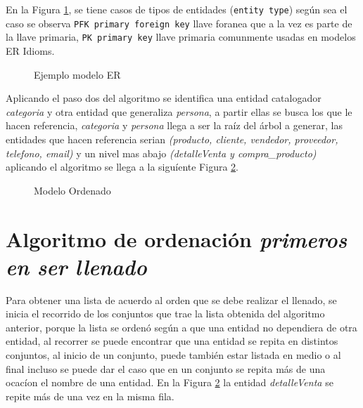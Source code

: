 En la Figura \ref{fig:Modelo ER}, se tiene casos de tipos de entidades (\texttt{entity type}) seg\'un sea el caso se observa \texttt{PFK primary foreign key} llave foranea que a la vez es parte de la llave primaria, \texttt{PK primary key} llave primaria comunmente usadas en modelos ER Idioms.
\begin{figure}[H]
\centering
{}
\caption{Ejemplo modelo ER} 
\label{fig:Modelo ER}
\end{figure}
Aplicando el paso dos del algoritmo se identifica una entidad catalogador \emph{categoria} y otra entidad que generaliza \emph{persona}, a partir ellas se busca los que le hacen referencia, \textit{categoria} y \textit{persona} llega a ser  la ra\'iz del \'arbol a generar, las entidades que hacen referencia serian \textit{(producto, cliente, vendedor, proveedor, telefono, email)} y un nivel mas abajo \textit{(detalleVenta y compra\_producto)}  aplicando el algoritmo se llega a la sigu\'iente Figura \ref{fig:ModeloOrdenado}.
\begin{figure}[H]
\centering
{}
\caption{Modelo Ordenado} \label{fig:ModeloOrdenado}
\end{figure}
\section{Algoritmo de ordenaci\'on \textit{primeros en ser llenado}}
\label{Algoritmo de ordenacion primeros en ser llenado}
Para obtener una lista de acuerdo al orden que se debe realizar el llenado, se inicia el recorrido de los conjuntos que trae la lista obtenida del algoritmo anterior, porque la lista se orden\'o seg\'un a que una entidad no dependiera de otra entidad, al recorrer se puede encontrar que una entidad se repita en distintos conjuntos, al  inicio de un conjunto, puede tambi\'en estar listada en medio o al final incluso se puede dar el caso que en un conjunto se repita m\'as de una ocac\'ion el nombre de una entidad. En la Figura \ref{fig:ModeloOrdenado} la entidad \textit{detalleVenta} se repite m\'as de una vez en la misma fila.

